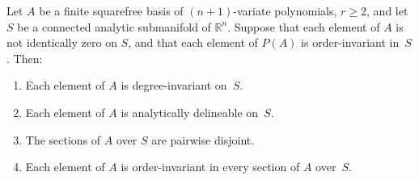 \begin{theorem}
  \label{thm:mccallum_3_2_3}
  \leanok
  Let $A$ be a finite squarefree basis of $(n{+}1)$-variate polynomials, $r \ge 2$,
  and let $S$ be a connected analytic submanifold of $\mathbb{R}^n$.  Suppose that
  each element of $A$ is not identically zero on $S$, and that each element of
  $P(A)$ is order-invariant in~$S$.  Then:
  \begin{enumerate}
    \item Each element of $A$ is degree-invariant on~$S$.
    \item Each element of $A$ is analytically delineable on~$S$.
    \item The sections of $A$ over $S$ are pairwise disjoint.
    \item Each element of $A$ is order-invariant in every section of $A$ over~$S$.
  \end{enumerate}
\end{theorem}

